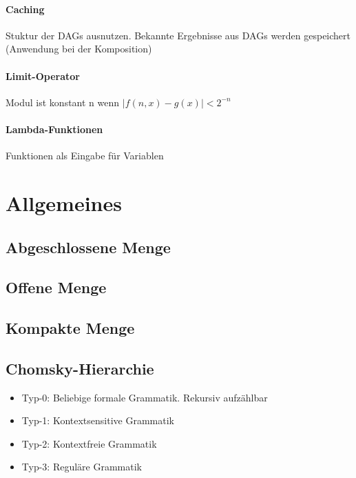 \documentclass[ngerman]{scrartcl}
\begin{document}
\paragraph{Caching} Stuktur der DAGs ausnutzen. Bekannte Ergebnisse aus DAGs werden gespeichert (Anwendung bei der Komposition)

\paragraph{Limit-Operator} Modul ist konstant n wenn $ |f(n,x) - g(x)| < 2^{-n} $ 

\paragraph{Lambda-Funktionen} Funktionen als Eingabe für Variablen


\section{Allgemeines}


\subsection{Abgeschlossene Menge}

\subsection{Offene Menge}

\subsection{Kompakte Menge}

\subsection{Chomsky-Hierarchie}
\begin{itemize}
  \item Typ-0: Beliebige formale Grammatik. Rekursiv aufzählbar
  \item Typ-1: Kontextsensitive Grammatik
  \item Typ-2: Kontextfreie Grammatik
  \item Typ-3: Reguläre Grammatik
\end{itemize}
\end{document}
